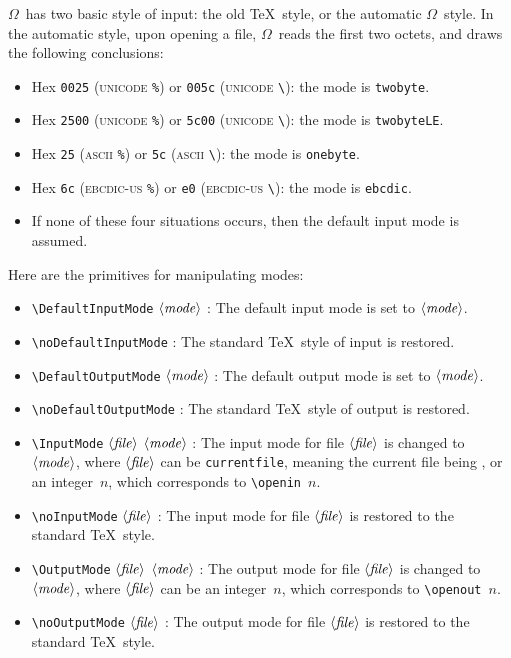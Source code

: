 \documentclass[fleqn]{article}
\newcommand{\OMEGA}{$\Omega$}
\newcommand{\showfile}{\langle\mbox{\emph{file}}\rangle}
\newcommand{\showmode}{\langle\mbox{\emph{mode}}\rangle}
\begin{document}
\OMEGA\ has two basic style of input: the old \TeX\ style, or the
automatic \OMEGA\ style.
In the automatic style, upon opening a file, \OMEGA\ reads the first
two octets, and draws the following conclusions:
\begin{itemize}
\item Hex \texttt{0025} (\textsc{unicode} \verb|%|)
or \texttt{005c} (\textsc{unicode} \verb|\|): the mode is \texttt{twobyte}.
\item Hex \texttt{2500} (\textsc{unicode} \verb|%|)
or \texttt{5c00} (\textsc{unicode} \verb|\|): the mode is \texttt{twobyteLE}.
\item Hex \texttt{25} (\textsc{ascii} \verb|%|)
or \texttt{5c} (\textsc{ascii} \verb|\|): the mode is \texttt{onebyte}.
\item Hex \texttt{6c} (\textsc{ebcdic-us} \verb|%|)
or \texttt{e0} (\textsc{ebcdic-us} \verb|\|): the mode is \texttt{ebcdic}.
\item If none of these four situations
occurs, then the default input mode is assumed.
\end{itemize}
%
Here are the primitives for manipulating modes:
\begin{itemize}
\item \verb|\DefaultInputMode| $\showmode$ :  The default input mode is set
to $\showmode$.
\item \verb|\noDefaultInputMode|  :  The standard \TeX\ style of
input is restored.
\item \verb|\DefaultOutputMode| $\showmode$ :  The default output mode
is set to $\showmode$.
\item \verb|\noDefaultOutputMode|  :  The standard \TeX\ style of
output is restored.
\item \verb|\InputMode| $\showfile$ $\showmode$ : The input mode for
file $\showfile$ is changed to $\showmode$, where $\showfile$ can be
\texttt{currentfile}, meaning the current file being \verb||,
or an integer~$n$, which corresponds to \verb|\openin|~$n$.
\item \verb|\noInputMode| $\showfile$ :  The input mode for
file $\showfile$ is restored to the standard \TeX\ style.
\item \verb|\OutputMode| $\showfile$ $\showmode$  :  The output
mode for file $\showfile$ is changed to $\showmode$, where
$\showfile$ can be an integer~$n$, which corresponds to
\verb|\openout|~$n$.
\item \verb|\noOutputMode| $\showfile$ :  The output mode for
file $\showfile$ is restored to the standard \TeX\ style.
\end{itemize}
\end{document}
